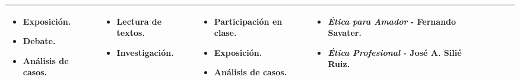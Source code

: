 \begin{landscape}
\begin{xltabular}{\linewidth}{@{}X@{}X@{}X@{}X@{}X@{}X@{}X@{}}
\begin{itemize}
            \item Exposición.
            \item Debate.
            \item Análisis de casos.
        \end{itemize}                             &
        \begin{itemize} %
            \item Lectura de textos.
            \item Investigación.
        \end{itemize}                             &
        \begin{itemize} %
            \item Participación en clase.
            \item Exposición.
            \item Análisis de casos.
        \end{itemize}                             &
        \begin{itemize} %
            \item \textit{Ética para Amador} - Fernando Savater.
            \item \textit{Ética Profesional} - José A. Silié Ruiz.
        \end{itemize}\\
        \bottomrule
    \end{xltabular}
\end{landscape}